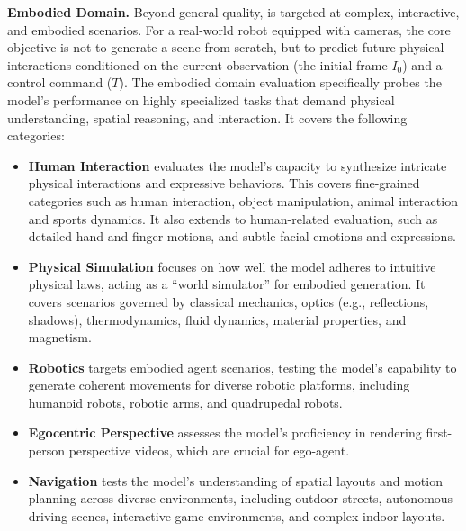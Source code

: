 \noindent\textbf{Embodied Domain.}
Beyond general quality, \method is targeted at complex, interactive, and embodied scenarios. 
For a real-world robot equipped with cameras, the core objective is not to generate a scene from scratch, but to predict future physical interactions conditioned on the current observation (the initial frame $I_0$) and a control command ($T$). 
The embodied domain evaluation specifically probes the model's performance on highly specialized tasks that demand physical understanding, spatial reasoning, and interaction. 
It covers the following categories:
\begin{itemize}
  \item \textbf{Human Interaction} evaluates the model's capacity to synthesize intricate physical interactions and expressive behaviors.
  This covers fine-grained categories such as human interaction, object manipulation, animal interaction and sports dynamics. 
  It also extends to human-related evaluation, such as detailed hand and finger motions, and subtle facial emotions and expressions.

  \item \textbf{Physical Simulation} focuses on how well the model adheres to intuitive physical laws, acting as a ``world simulator'' for embodied generation.
  It covers scenarios governed by classical mechanics, optics (e.g., reflections, shadows), thermodynamics, fluid dynamics, material properties, and magnetism.

  \item \textbf{Robotics} targets embodied agent scenarios, testing the model's capability to generate coherent movements for diverse robotic platforms, including humanoid robots, robotic arms, and quadrupedal robots.

  \item \textbf{Egocentric Perspective} assesses the model's proficiency in rendering first-person perspective videos, which are crucial for ego-agent.

  \item \textbf{Navigation} tests the model's understanding of spatial layouts and motion planning across diverse environments, including outdoor streets, autonomous driving scenes, interactive game environments, and complex indoor layouts.
\end{itemize}

